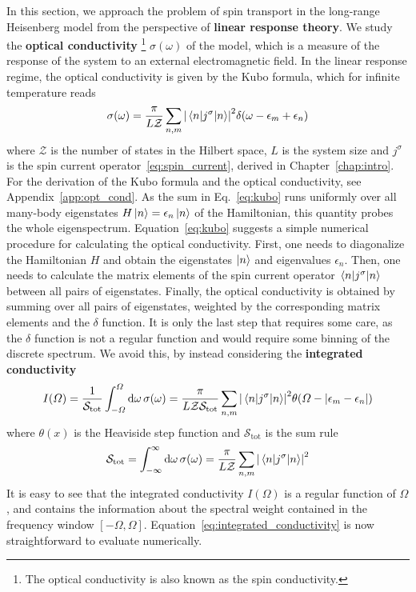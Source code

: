 In this section, we approach the problem of spin transport in the long-range Heisenberg model from the
perspective of \textbf{linear response theory}. We study the \textbf{optical conductivity}
\footnote{The optical conductivity is also known as the spin conductivity.} \(\sigma(\omega)\) of the model,
which is a measure of the response of the system to an external electromagnetic field. 
In the linear response regime, the optical conductivity is given by the Kubo formula, which
for infinite temperature reads
\begin{equation}
  \sigma(\omega) = \frac{\pi}{L \mathcal{Z}} \sum_{n,m} \abs{\mel{n}{j^{\sigma}}{n}}^2 \delta(\omega - \epsilon_m + \epsilon_n)
  \label{eq:kubo}
\end{equation}
where \(\mathcal{Z}\) is the number of states in the Hilbert space, \(L\) is the system size and \(j^{\sigma}\) is the spin
current operator~\eqref{eq:spin_current}, derived in Chapter~\ref{chap:intro}.
For the derivation of the Kubo formula and the optical conductivity, see Appendix~\ref{app:opt_cond}.
As the sum in Eq.~\eqref{eq:kubo} runs 
uniformly over all many-body eigenstates \(H \ket{n} = \epsilon_n \ket{n}\) of the Hamiltonian, this quantity
probes the whole eigenspectrum. Equation~\ref {eq:kubo} suggests a simple numerical procedure for calculating
the optical conductivity. First, one needs to diagonalize the Hamiltonian \(H\) and obtain the eigenstates
\(\ket{n}\) and eigenvalues \(\epsilon_n\). Then, one needs to calculate the matrix elements of the spin current operator
\(\mel{n}{j^{\sigma}}{n}\) between all pairs of eigenstates. Finally, the optical conductivity is obtained by
summing over all pairs of eigenstates, weighted by the corresponding matrix elements and the \(\delta\) function.
It is only the last step that requires some care, as the \(\delta\) function is not a regular function and
would require some binning of the discrete spectrum. We avoid this, by instead considering the
\textbf{integrated conductivity}
\begin{equation}
  I(\varOmega) = \frac{1}{\mathcal{S}_{\mathrm{tot}}} \int_{-\varOmega}^{\varOmega} \dd{\omega} \sigma(\omega) = 
  \frac{\pi}{L \mathcal{Z} \mathcal{S}_{\mathrm{tot}}} \sum_{n,m} \abs{\mel{n}{j^{\sigma}}{n}}^2 \theta(\varOmega- \abs{\epsilon_m - \epsilon_n})
  \label{eq:integrated_conductivity}
\end{equation}
where \(\theta(x)\) is the Heaviside step function and  \(\mathcal{S}_{\mathrm{tot}}\) is the sum rule
\begin{equation}
  \mathcal{S}_{\mathrm{tot}} = \int_{-\infty}^{\infty} \dd{\omega} \sigma(\omega) = \frac{\pi}{L \mathcal{Z}} \sum_{n,m} \abs{\mel{n}{j^{\sigma}}{n}}^2
\end{equation}
It is easy to see that the integrated conductivity \(I(\varOmega)\) is a regular function of \(\varOmega\), and
contains the information about the spectral weight contained in the frequency window 
\(\left[-\varOmega,\varOmega\right]\).
Equation~\eqref{eq:integrated_conductivity} is now straightforward to evaluate numerically.

